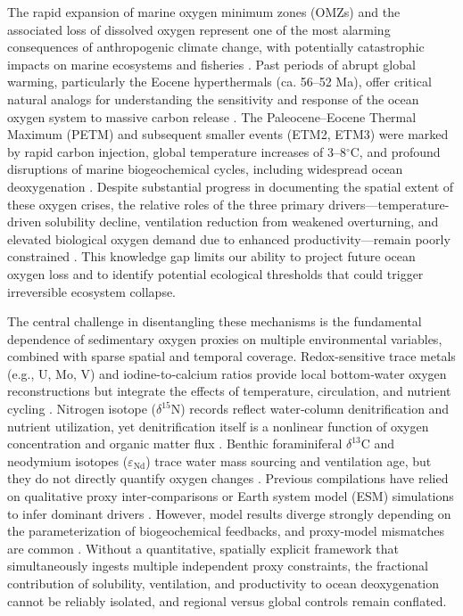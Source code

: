 \documentclass{article}
\begin{document}
The rapid expansion of marine oxygen minimum zones (OMZs) and the associated loss of dissolved oxygen represent one of the most alarming consequences of anthropogenic climate change, with potentially catastrophic impacts on marine ecosystems and fisheries \citep{keeling2010ocean, breitburg2018declining}. Past periods of abrupt global warming, particularly the Eocene hyperthermals (ca. 56–52 Ma), offer critical natural analogs for understanding the sensitivity and response of the ocean oxygen system to massive carbon release \citep{zeebe2009carbon, sexton2011eocene}. The Paleocene–Eocene Thermal Maximum (PETM) and subsequent smaller events (ETM2, ETM3) were marked by rapid carbon injection, global temperature increases of 3–8$^{\circ}$C, and profound disruptions of marine biogeochemical cycles, including widespread ocean deoxygenation \citep{norris2013marine, lu2018oxygen}. Despite substantial progress in documenting the spatial extent of these oxygen crises, the relative roles of the three primary drivers—temperature-driven solubility decline, ventilation reduction from weakened overturning, and elevated biological oxygen demand due to enhanced productivity—remain poorly constrained \citep{ridgwell2010past, cramer2009ocean}. This knowledge gap limits our ability to project future ocean oxygen loss and to identify potential ecological thresholds that could trigger irreversible ecosystem collapse.

The central challenge in disentangling these mechanisms is the fundamental dependence of sedimentary oxygen proxies on multiple environmental variables, combined with sparse spatial and temporal coverage. Redox-sensitive trace metals (e.g., U, Mo, V) and iodine-to‑calcium ratios provide local bottom‑water oxygen reconstructions but integrate the effects of temperature, circulation, and nutrient cycling \citep{hoogakker2018proxy, lu2016iodine}. Nitrogen isotope ($\delta^{15}$N) records reflect water‑column denitrification and nutrient utilization, yet denitrification itself is a nonlinear function of oxygen concentration and organic matter flux \citep{kump2011chemocline}. Benthic foraminiferal $\delta^{13}$C and neodymium isotopes ($\varepsilon_{\text{Nd}}$) trace water mass sourcing and ventilation age, but they do not directly quantify oxygen changes \citep{scher2004eocene}. Previous compilations have relied on qualitative proxy inter‑comparisons or Earth system model (ESM) simulations to infer dominant drivers \citep{norris2013marine, dunne2013gfdl}. However, model results diverge strongly depending on the parameterization of biogeochemical feedbacks, and proxy‑model mismatches are common \citep{lu2018oxygen}. Without a quantitative, spatially explicit framework that simultaneously ingests multiple independent proxy constraints, the fractional contribution of solubility, ventilation, and productivity to ocean deoxygenation cannot be reliably isolated, and regional versus global controls remain conflated.
\end{document}
